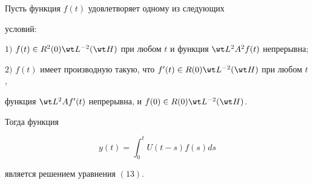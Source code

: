 \begin{thm} 


Пусть функция $f(t)$ удовлетворяет одному из следующих 


условий\/${:}$ 


 


$1)$ $f(t)\in R^2(0)\wt L{}^{-2}(\wt H)$ при любом $t$ и функция $\wt 


L{}^2A^2f(t)$ непрерывна$;$ 


 


$2)$ $f(t)$ имеет производную такую, что $f'(t)\in R(0)\wt L{}^{-2}(\wt 


H)$ при любом $t$, 


функция $\wt L{}^2Af'(t)$ непрерывна, и $f(0)\in R(0)\wt L{}^{-2}(\wt H)$. 


 


Тогда функция 


\begin{equation} 


y(t)=\int^t_0 U(t-s)f(s)ds 


\end{equation} 


является решением уравнения $(13)$. 


\end{thm} 


 


 


